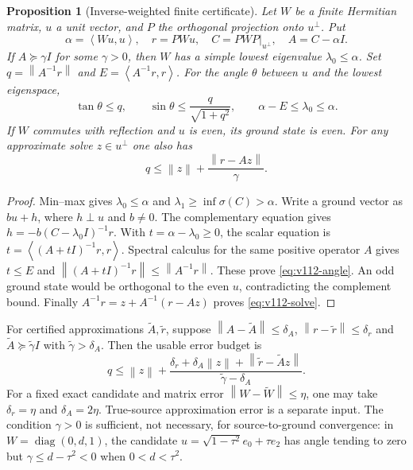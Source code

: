 \documentclass[11pt]{article}
\newtheorem{proposition}[theorem]{Proposition}
\theoremstyle{remark}
\newcommand{\norm}[1]{\left\lVert #1\right\rVert}
\newcommand{\ip}[2]{\left\langle #1,#2\right\rangle}
\begin{document}
\begin{proposition}[Inverse-weighted finite certificate]
\label{prop:v112-schur-angle}
Let $W$ be a finite Hermitian matrix, $u$ a unit vector, and $P$ the
orthogonal projection onto $u^\perp$. Put
\[
 \alpha=\ip{Wu}{u},\quad r=PWu,\quad
 C=PWP|_{u^\perp},\quad A=C-\alpha I.
\]
If $A\succeq\gamma I$ for some $\gamma>0$, then $W$ has a simple
lowest eigenvalue $\lambda_0\le\alpha$. Set
$q=\norm{A^{-1}r}$ and $E=\ip{A^{-1}r}{r}$. For the angle $\theta$
between $u$ and the lowest eigenspace,
\begin{equation}\label{eq:v112-angle}
 \tan\theta\le q,\qquad
 \sin\theta\le\frac{q}{\sqrt{1+q^2}},\qquad
 \alpha-E\le\lambda_0\le\alpha.
\end{equation}
If $W$ commutes with reflection and $u$ is even, its ground state is even.
For any approximate solve $z\in u^\perp$ one also has
\begin{equation}\label{eq:v112-solve}
 q\le\norm z+\frac{\norm{r-Az}}{\gamma}.
\end{equation}
\end{proposition}
\begin{proof}
Min--max gives $\lambda_0\le\alpha$ and
$\lambda_1\ge\inf\sigma(C)>\alpha$. Write a ground vector as $bu+h$,
where $h\perp u$ and $b\ne0$. The complementary equation gives
$h=-b(C-\lambda_0 I)^{-1}r$. With $t=\alpha-\lambda_0\ge0$, the
scalar equation is $t=\ip{(A+tI)^{-1}r}{r}$. Spectral calculus for
the same positive operator $A$ gives $t\le E$ and
$\norm{(A+tI)^{-1}r}\le\norm{A^{-1}r}$. These prove
\eqref{eq:v112-angle}. An odd ground state would be orthogonal to the
even $u$, contradicting the complement bound. Finally
$A^{-1}r=z+A^{-1}(r-Az)$ proves \eqref{eq:v112-solve}.
\end{proof}

For certified approximations $\widetilde A,\widetilde r$, suppose
$\norm{A-\widetilde A}\le\delta_A$,
$\norm{r-\widetilde r}\le\delta_r$ and
$\widetilde A\succeq\widetilde\gamma I$ with
$\widetilde\gamma>\delta_A$. Then the usable error budget is
\[
 q\le\norm z+
 \frac{\delta_r+\delta_A\norm z+
       \norm{\widetilde r-\widetilde A z}}
      {\widetilde\gamma-\delta_A}.
\]
For a fixed exact candidate and matrix error $\norm{W-\widetilde W}\le\eta$,
one may take $\delta_r=\eta$ and $\delta_A=2\eta$.
True-source approximation error is a separate input. The condition
$\gamma>0$ is sufficient, not necessary, for source-to-ground
convergence: in $W=\operatorname{diag}(0,d,1)$, the candidate
$u=\sqrt{1-\tau^2}e_0+\tau e_2$ has angle tending to zero but
$\gamma\le d-\tau^2<0$ when $0<d<\tau^2$.
\end{document}
